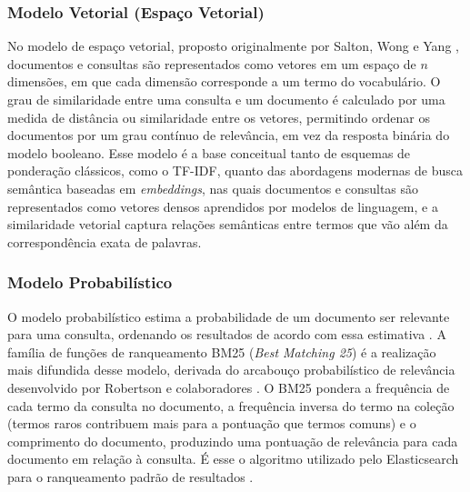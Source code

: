 \subsubsection{Modelo Vetorial (Espaço Vetorial)}\label{sec:modelo-vetorial}
No modelo de espaço vetorial, proposto originalmente por Salton, Wong e Yang \cite{salton1975vector}, documentos e consultas são representados como vetores em um espaço de $n$ dimensões, em que cada dimensão corresponde a um termo do vocabulário. O grau de similaridade entre uma consulta e um documento é calculado por uma medida de distância ou similaridade entre os vetores, permitindo ordenar os documentos por um grau contínuo de relevância, em vez da resposta binária do modelo booleano. Esse modelo é a base conceitual tanto de esquemas de ponderação clássicos, como o TF-IDF, quanto das abordagens modernas de busca semântica baseadas em \textit{embeddings}, nas quais documentos e consultas são representados como vetores densos aprendidos por modelos de linguagem, e a similaridade vetorial captura relações semânticas entre termos que vão além da correspondência exata de palavras.

\subsubsection{Modelo Probabilístico}
O modelo probabilístico estima a probabilidade de um documento ser relevante para uma consulta, ordenando os resultados de acordo com essa estimativa \cite{baezayates2010modern}. A família de funções de ranqueamento BM25 (\textit{Best Matching 25}) é a realização mais difundida desse modelo, derivada do arcabouço probabilístico de relevância desenvolvido por Robertson e colaboradores \cite{robertson2009bm25}. O BM25 pondera a frequência de cada termo da consulta no documento, a frequência inversa do termo na coleção (termos raros contribuem mais para a pontuação que termos comuns) e o comprimento do documento, produzindo uma pontuação de relevância para cada documento em relação à consulta. É esse o algoritmo utilizado pelo Elasticsearch para o ranqueamento padrão de resultados \cite{IBMElasticsearch}.

